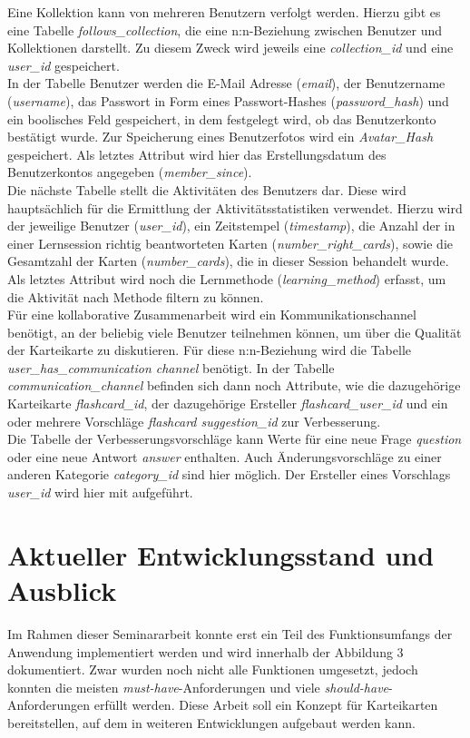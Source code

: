 Eine Kollektion kann von mehreren Benutzern verfolgt werden. Hierzu gibt es eine Tabelle \emph{follows{\_}collection}, die eine n:n-Beziehung zwischen Benutzer und Kollektionen darstellt. Zu diesem Zweck wird jeweils eine \emph{collection{\_}id} und eine \emph{user{\_}id} gespeichert. \\

In der Tabelle Benutzer werden die E-Mail Adresse (\emph{email}), der Benutzername (\emph{username}), das Passwort in Form eines Passwort-Hashes (\emph{password{\_}hash}) und ein boolisches Feld gespeichert, in dem festgelegt wird, ob das Benutzerkonto bestätigt wurde. Zur Speicherung eines Benutzerfotos wird ein \emph{Avatar{\_}Hash} gespeichert. Als letztes Attribut wird hier das Erstellungsdatum des Benutzerkontos angegeben (\emph{member{\_}since}). \\

Die nächste Tabelle stellt die Aktivitäten des Benutzers dar. Diese wird hauptsächlich für die Ermittlung der Aktivitätsstatistiken verwendet. Hierzu wird der jeweilige Benutzer (\emph{user{\_}id}), ein Zeitstempel (\emph{timestamp}), die Anzahl der in einer Lernsession richtig beantworteten Karten (\emph{number{\_}right{\_}cards}), sowie die Gesamtzahl der Karten (\emph{number{\_}cards}), die in dieser Session behandelt wurde. Als letztes Attribut wird noch die Lernmethode (\emph{learning{\_}method}) erfasst, um die Aktivität nach Methode filtern zu können. \\

Für eine kollaborative Zusammenarbeit wird ein Kommunikationschannel benötigt, an der beliebig viele Benutzer teilnehmen können, um über die Qualität der Karteikarte zu diskutieren. Für diese n:n-Beziehung wird die Tabelle \emph{user{\_}has{\_}communication channel} benötigt. In der Tabelle \emph{communication{\_}channel} befinden sich dann noch Attribute, wie die dazugehörige Karteikarte \emph{flashcard{\_}id}, der dazugehörige Ersteller \emph{flashcard{\_}user{\_}id} und ein oder mehrere Vorschläge \emph{flashcard suggestion{\_}id} zur Verbesserung. \\

Die Tabelle der Verbesserungsvorschläge kann Werte für eine neue Frage \emph{question} oder eine neue Antwort \emph{answer} enthalten. Auch Änderungsvorschläge zu einer anderen Kategorie \emph{category{\_}id} sind hier möglich. Der Ersteller eines Vorschlags \emph{user{\_}id} wird hier mit aufgeführt.


\section{Aktueller Entwicklungsstand und Ausblick}
Im Rahmen dieser Seminararbeit konnte erst ein Teil des Funktionsumfangs der Anwendung implementiert werden und wird innerhalb der Abbildung 3 dokumentiert. Zwar wurden noch nicht alle Funktionen umgesetzt, jedoch konnten die meisten \emph{must-have}-Anforderungen und viele \emph{should-have}-Anforderungen erfüllt werden. Diese Arbeit soll ein Konzept für Karteikarten bereitstellen, auf dem in weiteren Entwicklungen aufgebaut werden kann. \\

